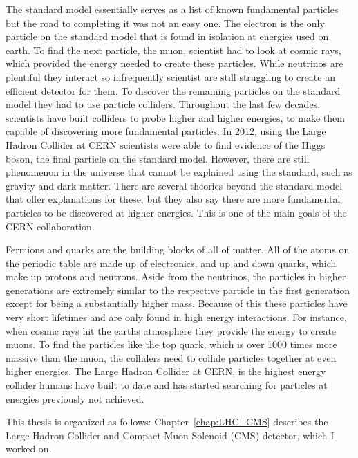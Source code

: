 The standard model essentially serves as a list of known fundamental particles but the road to completing it was not an easy one. The electron is the only particle on the standard model that is found in isolation at energies used on earth. To find the next particle, the muon, scientist had to look at cosmic rays, which provided the energy needed to create these particles. While neutrinos are plentiful they interact so infrequently scientist are still struggling to create an efficient detector for them. To discover the remaining particles on the standard model they had to use particle colliders. Throughout the last few decades, scientists have built colliders to probe higher and higher energies, to make them capable of discovering more fundamental particles. In 2012, using the Large Hadron Collider at CERN scientists were able to find evidence of the Higgs boson, the final particle on the standard model. However, there are still phenomenon in the universe that cannot be explained using the standard, such as gravity and dark matter. There are several theories beyond the standard model that offer explanations for these, but they also say there are more fundamental particles to be discovered at higher energies. This is one of the main goals of the CERN collaboration. 


Fermions and quarks are the building blocks of all of matter. All of the atoms on the periodic table are made up of electronics, and up and down quarks, which make up protons and neutrons. Aside from the neutrinos, the particles in higher generations are extremely similar to the respective particle in the first generation except for being a substantially higher mass. Because of this these particles have very short lifetimes and are only found in high energy interactions. For instance, when cosmic rays hit the earths atmosphere they provide the energy to create muons. To find the particles like the top quark, which is over 1000 times more massive than the muon, the colliders need to collide particles together at even higher energies. The Large Hadron Collider at CERN, is the highest energy collider humans have built to date and has started searching for particles at energies previously not achieved.

This thesis is organized as follows: Chapter~\ref{chap:LHC_CMS} describes the Large Hadron Collider and Compact Muon Solenoid (CMS) detector, which I worked on.